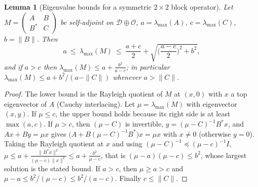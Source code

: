 \documentclass[11pt]{article}
\newtheorem{lemma}[theorem]{Lemma}
\theoremstyle{remark}
\begin{document}
\begin{lemma}[Eigenvalue bounds for a symmetric $2\times2$ block operator]\label{lem:diag-block}
Let $M=\begin{pmatrix}A&B\\B^*&C\end{pmatrix}$ be self-adjoint on $\mathcal D\oplus\mathcal O$, $a=\lambda_{\max}(A)$, $c=\lambda_{\max}(C)$, $b=\|B\|$. Then
\[
a\ \le\ \lambda_{\max}(M)\ \le\ \frac{a+c}2+\sqrt{\Big(\frac{a-c}2\Big)^2+b^2},
\]
and if $a>c$ then $\lambda_{\max}(M)\le a+\frac{b^2}{a-c}$; in particular $\lambda_{\max}(M)\le a+b^2/(a-\|C\|)$ whenever $a>\|C\|$.
\end{lemma}
\begin{proof}
The lower bound is the Rayleigh quotient of $M$ at $(x,0)$ with $x$ a top eigenvector of $A$ (Cauchy interlacing). Let $\mu=\lambda_{\max}(M)$ with eigenvector $(x,y)$. If $\mu\le c$, the upper bound holds because its right side is at least $\max(a,c)$. If $\mu>c$, then $(\mu-C)$ is invertible, $y=(\mu-C)^{-1}B^*x$, and $Ax+By=\mu x$ gives $\big(A+B(\mu-C)^{-1}B^*\big)x=\mu x$ with $x\ne0$ (otherwise $y=0$). Taking the Rayleigh quotient at $x$ and using $(\mu-C)^{-1}\preceq(\mu-c)^{-1}I$,
$\mu\le a+\frac{\|B^*x\|^2}{(\mu-c)\|x\|^2}\le a+\frac{b^2}{\mu-c}$, that is $(\mu-a)(\mu-c)\le b^2$, whose largest solution is the stated bound. If $a>c$, then $\mu\ge a>c$ and $\mu-a\le b^2/(\mu-c)\le b^2/(a-c)$. Finally $c\le\|C\|$.
\end{proof}
\end{document}
